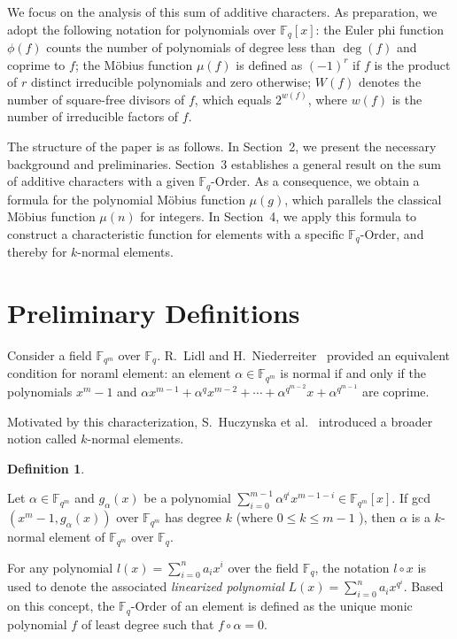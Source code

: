 \documentclass[12pt,a4paper]{article}
\theoremstyle{plain}
\theoremstyle{definition}
\newtheorem{defn}{Definition}[section]
\numberwithin{equation}{section}
\begin{document}
    We focus on the analysis of this sum of additive characters. As preparation, we adopt the following notation for polynomials over $\mathbb{F}_q[x]$: the Euler phi function $\phi(f)$ counts the number of polynomials of degree less than $\deg(f)$ and coprime to $f$; the Möbius function $\mu(f)$ is defined as $(-1)^r$ if $f$ is the product of $r$ distinct irreducible polynomials and zero otherwise; $W(f)$ denotes the number of square-free divisors of $f$, which equals $2^{w(f)}$, where $w(f)$ is the number of irreducible factors of $f$.

    The structure of the paper is as follows. In Section~2, we present the necessary background and preliminaries. Section~3 establishes a general result on the sum of additive characters with a given $\mathbb{F}_q$-Order. As a consequence, we obtain a formula for the polynomial Möbius function $\mu(g)$, which parallels the classical Möbius function $\mu(n)$ for integers. In Section~4, we apply this formula to construct a characteristic function for elements with a specific $\mathbb{F}_q$-Order, and thereby for $k$-normal elements. 

    \section{Preliminary Definitions}
    
    Consider a field $\mathbb{F}_{q^m}$ over $\mathbb{F}_q$. R.~Lidl and H.~Niederreiter~\cite{LIDL} provided an equivalent condition for noraml element: an element $\alpha \in \mathbb{F}_{q^m}$ is normal if and only if the polynomials $x^m - 1$ and $\alpha x^{m-1} + \alpha^q x^{m-2} + \cdots + \alpha^{q^{m-2}} x + \alpha^{q^{m-1}}$ are coprime.

    Motivated by this characterization, S.~Huczynska et al.~\cite{Mullen2013Existance} introduced a broader notion called $k$-normal elements.
    \begin{defn}\cite{Mullen2013Existance} 
    
        Let $\alpha \in \mathbb{F}_{q^m}$ and $g_\alpha(x)$ be a polynomial $\sum\limits_{i=0}^{m-1} \alpha^{q^i} x^{m-1-i} \in \mathbb{F}_{q^m}[x]$. If gcd$\left(x^m-1, g_\alpha\left(x\right) \right)$ over $\mathbb{F}_{q^m}$ has degree $k$ (where $0 \leq k \leq m-1$ ), then $\alpha$ is a $k$-normal element of $\mathbb{F}_{q^m}$ over $\mathbb{F}_q$.
    \end{defn}

    For any polynomial $l(x) = \displaystyle \sum_{i=0}^n a_i x^i$ over the field $\mathbb{F}_q$, the notation $l \circ x$ is used to denote the associated \emph{linearized polynomial} $L(x) = \displaystyle \sum_{i=0}^n a_i x^{q^i}$. Based on this concept, the $\mathbb{F}_q$-Order of an element is defined as the unique monic polynomial $f$ of least degree such that $f \circ \alpha = 0$.
\end{document}
